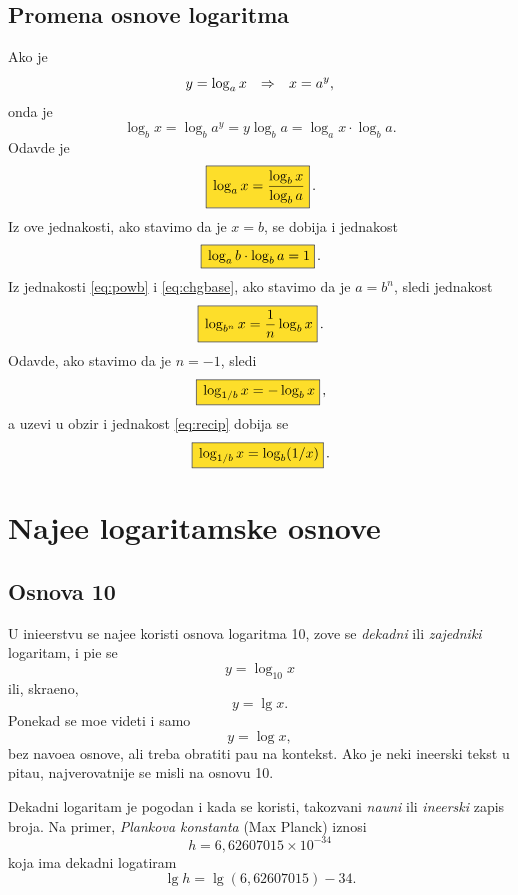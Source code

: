 \documentclass[12pt, twoside, a4paper]{article}
\def\logten{\log_{10}}
\def\loga{\log_a}
\def\logb{\log_b}
\def\puta{\times}
\def\.{{,}}
\begin{document}
\subsection{Promena osnove logaritma}

Ako je
$$
y = \loga x\sledi x = a^y,
$$
onda je 
$$
\logb x=\logb a^y=y\logb a=\loga x\cdot\logb a.
$$
Odavde je
\begin{equation}
\okvir{\loga x={\logb x\over\logb a}}.
\label{eq:chgbase}
\end{equation}
Iz ove jednakosti, ako stavimo da je $x=b$, se dobija i jednakost
\begin{equation}
\okvir{\loga b\cdot\logb a = 1}.
\end{equation}
Iz jednakosti \eqref{eq:powb} i \eqref{eq:chgbase}, ako stavimo da je $a=b^n$, sledi jednakost
\begin{equation}
\okvir{\log_{b^n}x = {1\over n}\logb x}.
\label{eq:powbase}
\end{equation}
Odavde, ako stavimo da je $n=-1$, sledi
\begin{equation}
\okvir{\log_{1/b}x = -\logb x},
\end{equation}
a uzev{\sv}i u obzir i jednakost \eqref{eq:recip} dobija se
\begin{equation}
\okvir{\log_{1/b}x = \logb(1/x)}.
\end{equation}



\section{Naj{\cv}e{\sv}{\cc}e logaritamske osnove}

\subsection{Osnova 10}

U ini{\zv}e{\nj}erstvu se naj{\cv}e{\sv}{\cc}e koristi osnova logaritma 10,
zove se {\sl dekadni\/} ili {\sl zajedni{\cv}ki\/} logaritam, i pi{\sv}e se
$$
y=\logten x
$$
ili, skra{\cc}eno,
$$
y=\lg x.
$$
Ponekad se mo{\zv}e videti i samo
$$
y=\log x,
$$
bez navo{\dj}e{\nj}a osnove, ali treba obratiti pa{\zv}{\nj}u na kontekst.
Ako je neki in{\zv}e{\nj}erski tekst u pita{\nj}u, najverovatnije se misli na osnovu 10.

Dekadni logaritam je pogodan i kada se koristi, takozvani {\sl nau{\cv}ni\/} ili {\sl in{\zv}e{\nj}erski\/}
zapis broja.
Na primer, {\sl Plankova konstanta\/} (Max Planck) iznosi
$$
h=6\.62607015\puta 10^{-34}
$$
koja ima dekadni logatiram
$$
\lg h=\lg(6\.62607015) - 34.
$$
\end{document}
